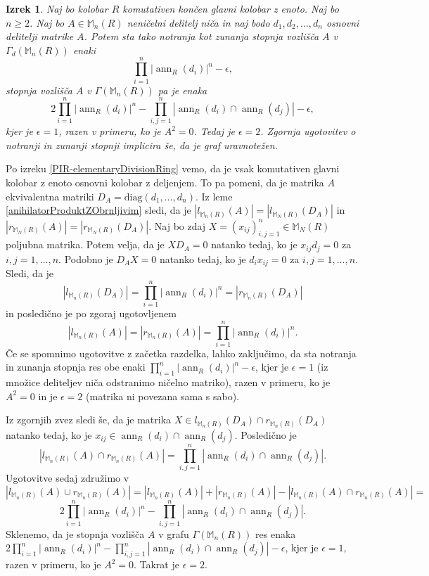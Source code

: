 \documentclass[a4paper, 12pt]{amsart}
\theoremstyle{definition} %
\theoremstyle{plain} %
\newtheorem{izrek}[definicija]{Izrek}
\newcommand{\M}{\mathbb M}
\DeclareMathOperator{\ann}{ann}
\begin{document}
\begin{izrek}
\label{inDegreeOutDegree}
Naj bo kolobar $R$ komutativen končen glavni kolobar z enoto. Naj bo $n \ge 2$. Naj bo $A\in \M_n(R)$ neničelni delitelj niča in naj bodo $d_1,d_2, \dots,d_n$ osnovni delitelji matrike $A$. Potem sta tako notranja kot zunanja stopnja vozlišča $A$ v $\Gamma_d(\M_n(R))$ enaki
$$
\prod_{i=1}^n |\ann_R(d_i)|^n - \epsilon,
$$ 
stopnja vozlišča $A$ v $\Gamma(\M_n(R))$ pa je enaka
$$
2\prod_{i=1}^n |\ann_R(d_i)|^n - \prod_{i,j=1}^n |\ann_R(d_i) \cap \ann_R(d_j)| - \epsilon,
$$
kjer je $\epsilon =1$, razen v primeru, ko je $A^2 = 0$. Tedaj je $\epsilon = 2$. Zgornja ugotovitev o notranji in zunanji stopnji implicira še, da je graf uravnotežen.
\end{izrek}
 
\proof
Po izreku  \ref{PIR-elementaryDivisionRing} vemo, da je vsak komutativen glavni kolobar z enoto osnovni kolobar z deljenjem. To pa pomeni, da je matrika $A$ ekvivalentna matriki $D_A= \text{diag}(d_1,\dots,d_n)$. Iz leme \ref{anihilatorProduktZObrnljivim} sledi, da je $|l_{\M_n(R)}(A)| = |l_{\M_N(R)}(D_A)|$ in $|r_{\M_N(R)}(A)| = |r_{\M_N(R)}(D_A)|$. Naj bo zdaj $X=(x_{ij})_{i,j=1}^n\in \M_N(R)$ poljubna matrika. Potem velja, da je $XD_A = 0$ natanko tedaj, ko je $x_{ij}d_j = 0$ za $i,j = 1, \dots, n$. Podobno je $D_AX = 0$ natanko tedaj, ko je $d_i x_{ij} =0 $ za $i,j=1,\dots,n$. Sledi, da je 
$$
|l_{\M_n(R)}(D_A)| = \prod_{i=1}^n |\ann_R(d_i)|^n = |r_{\M_n(R)}(D_A)|
$$
in posledično je po zgoraj ugotovljenem
$$
|l_{\M_n(R)}(A)|= |r_{\M_n(R)}(A)| = \prod_{i=1}^n |\ann_R(d_i)|^n .
$$
Če se spomnimo ugotovitve z začetka razdelka, lahko zaključimo, da sta notranja in zunanja stopnja res obe enaki $\prod_{i=1}^n  |\ann_R(d_i)|^n - \epsilon$, kjer je $\epsilon = 1$ (iz množice deliteljev niča odstranimo ničelno matriko), razen v primeru, ko je $A^2 = 0$ in je $\epsilon = 2$ (matrika ni povezana sama s sabo). 

Iz zgornjih zvez sledi še, da je matrika $X\in l_{\M_n(R)}(D_A)\cap r_{\M_n(R)}(D_A)$ natanko tedaj, ko je $x_{ij} \in  \ann_R(d_i)\cap \ann_R(d_j)$. Posledično je 
$$
|l_{\M_n(R)}(A) \cap r_{\M_n(R)}(A)| = \prod_{i,j=1}^n | \ann_R(d_i) \cap \ann_R(d_j)|.
$$
Ugotovitve sedaj združimo v 
$$
|l_{\M_n(R)}(A) \cup r_{\M_n(R)}(A)| = |l_{\M_n(R)}(A)|  + |r_{\M_n(R)}(A)| - |l_{\M_n(R)}(A) \cap r_{\M_n(R)}(A)|=
$$
$$
2\prod_{i=1}^n |\ann_R(d_i)|^n - \prod_{i,j=1}^n |\ann_R(d_i) \cap \ann_R(d_j)|.
$$
Sklenemo, da je stopnja vozlišča $A$ v grafu $\Gamma(\M_n(R))$ res enaka $2\prod_{i=1}^n |\ann_R(d_i)|^n - \prod_{i,j=1}^n |\ann_R(d_i) \cap \ann_R(d_j)| -\epsilon$, kjer je $\epsilon=1$, razen v primeru, ko je $A^2 = 0$. Takrat je $\epsilon=2$.
\endproof
\end{document}
